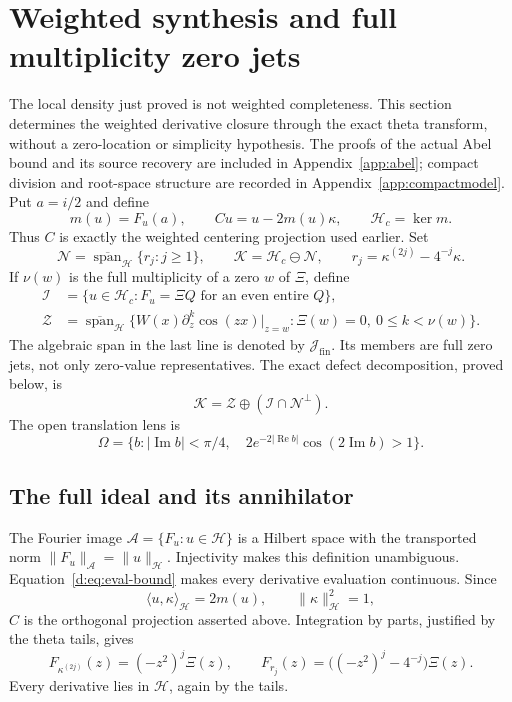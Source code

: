 \documentclass[11pt,a4paper]{article}
\numberwithin{equation}{section}
\theoremstyle{definition}\newtheorem{definition}[theorem]{Definition}
\theoremstyle{remark}\newtheorem{remark}[theorem]{Remark}
\newcommand{\Hh}{\mathcal H}\newcommand{\Hw}{\mathcal H}
\newcommand{\ip}[2]{\langle#1,#2\rangle}\newcommand{\norm}[1]{\lVert#1\rVert}\newcommand{\abs}[1]{\lvert#1\rvert}
\newcommand{\Nn}{\mathcal N}\newcommand{\Ii}{\mathcal I}\newcommand{\Zz}{\mathcal Z}
\newcommand{\Kk}{\mathcal K}\newcommand{\Aa}{\mathcal A}\newcommand{\Ff}{\mathcal F}
\newcommand{\cl}{\overline{\operatorname{span}}}\newcommand{\Ran}{\operatorname{Ran}}\newcommand{\HS}{\mathfrak S_2}
\begin{document}
\section{Weighted synthesis and full multiplicity zero jets}\label{sec:synthesis-unified}
The local density just proved is not weighted completeness. This section determines the weighted derivative closure through the exact theta transform, without a zero-location or simplicity hypothesis. The proofs of the actual Abel bound and its source recovery are included in Appendix~\ref{app:abel}; compact division and root-space structure are recorded in Appendix~\ref{app:compactmodel}.
Put $a=i/2$ and define
\begin{equation}\label{d:eq:center-intro}
 m(u)=F_u(a),\qquad Cu=u-2m(u)\kappa,\qquad \Hh_c=\ker m.
\end{equation}
Thus $C$ is exactly the weighted centering projection used earlier. Set
\begin{equation}\label{d:eq:N-intro}
 \Nn=\cl_{\Hh}\{r_j:j\ge1\},\qquad \Kk=\Hh_c\ominus\Nn,
 \qquad r_j=\kappa^{(2j)}-4^{-j}\kappa.
\end{equation}
If $\nu(w)$ is the full multiplicity of a zero $w$ of $\Xi$, define
\begin{align}
 \Ii&=\{u\in\Hh_c:F_u=\Xi Q\text{ for an even entire }Q\},\label{d:eq:I-intro}\\
 \Zz&=\cl_{\Hh}\{W(x)\partial_z^k\cos(zx)|_{z=w}:\Xi(w)=0,\ 0\le k<\nu(w)\}.
 \label{d:eq:Z-intro}
\end{align}
The algebraic span in the last line is denoted by $\mathcal J_{\mathrm{fin}}$. Its members are full zero jets, not only zero-value representatives.
The exact defect decomposition, proved below, is
\begin{equation}\label{d:eq:main-defect}
 \Kk=\Zz\oplus(\Ii\cap\Nn^\perp).
\end{equation}
The open translation lens is
\begin{equation}\label{d:eq:lens-intro}
 \Omega=\{b:|\operatorname{Im}b|<\pi/4,\quad
 2e^{-2|\operatorname{Re}b|}\cos(2\operatorname{Im}b)>1\}.
\end{equation}


\subsection{The full ideal and its annihilator}\label{d:sec:ideal}

The Fourier image $\Aa=\{F_u:u\in\Hh\}$ is a Hilbert space with the transported norm $\norm{F_u}_{\Aa}=\norm{u}_{\Hh}$. Injectivity makes this definition unambiguous. Equation~\eqref{d:eq:eval-bound} makes every derivative evaluation continuous. Since
\[
 \ip{u}{\kappa}_{\Hh}=2m(u),\qquad \norm{\kappa}_{\Hh}^2=1,
\]
$C$ is the orthogonal projection asserted above. Integration by parts, justified by the theta tails, gives
\begin{equation}\label{d:eq:derivative-transforms}
 F_{\kappa^{(2j)}}(z)=(-z^2)^j\Xi(z),\qquad
 F_{r_j}(z)=\bigl((-z^2)^j-4^{-j}\bigr)\Xi(z).
\end{equation}
Every derivative lies in $\Hh$, again by the tails.
\end{document}
